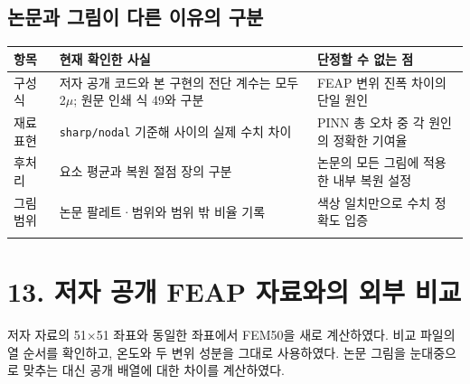 \documentclass[10pt,a4paper]{article}
\begin{document}
\subsection{논문과 그림이 다른 이유의 구분}

\begingroup\small

\par\begin{minipage}{\linewidth}\begin{tabular}{>{\raggedright\arraybackslash}p{}>{\raggedright\arraybackslash}p{}>{\raggedright\arraybackslash}p{}}

\rowcolor{tint} \textbf{항목} & \textbf{현재 확인한 사실} & \textbf{단정할 수 없는 점}\\\midrule

구성식 & 저자 공개 코드와 본 구현의 전단 계수는 모두 2$\mu$; 원문 인쇄 식 49와 구분 & FEAP 변위 진폭 차이의 단일 원인\\\addlinespace[2pt]

재료 표현 & \nolinkurl{sharp/nodal} 기준해 사이의 실제 수치 차이 & PINN 총 오차 중 각 원인의 정확한 기여율\\\addlinespace[2pt]

후처리 & 요소 평균과 복원 절점 장의 구분 & 논문의 모든 그림에 적용한 내부 복원 설정\\\addlinespace[2pt]

그림 범위 & 논문 팔레트·범위와 범위 밖 비율 기록 & 색상 일치만으로 수치 정확도 입증\\\addlinespace[2pt]

\bottomrule\end{tabular}\end{minipage}\par\vspace{5pt}\endgroup

\clearpage

\section{13. 저자 공개 FEAP 자료와의 외부 비교}

저자 자료의 51$\times$51 좌표와 동일한 좌표에서 FEM50을 새로 계산하였다. 비교 파일의 열 순서를 확인하고, 온도와 두 변위 성분을 그대로 사용하였다. 논문 그림을 눈대중으로 맞추는 대신 공개 배열에 대한 차이를 계산하였다.\par
\end{document}

